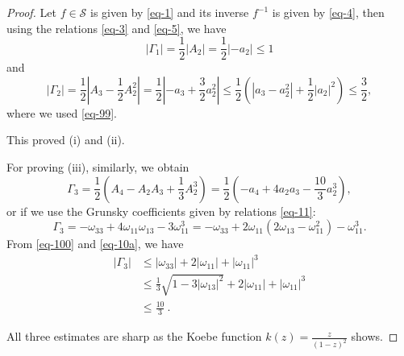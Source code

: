 \documentclass[10pt,a4paper]{amsart}
\begin{document}
\begin{proof}
Let $f\in\mathcal{S}$ is given by \eqref{eq-1} and its inverse $f^{-1}$ is given by \eqref{eq-4}, then using the relations \eqref{eq-3} and \eqref{eq-5}, we have
\[ |\Gamma_{1}|=\frac{1}{2}|A_{2}|=\frac{1}{2}|-a_{2}|\leq 1\]
and
\[|\Gamma_{2}|=\frac{1}{2}|A_{3}-\frac{1}{2}A_{2}^{2}|=\frac{1}{2}|-a_{3}+\frac{3}{2}a_{2}^{2}|
\leq \frac{1}{2}(|a_{3}-a_{2}^{2}|+\frac{1}{2}|a_{2}|^{2})\leq\frac{3}{2},\]
where we used \eqref{eq-99}.

\medskip

This proved (i) and (ii).

\medskip

For proving (iii), similarly, we obtain
\[
\Gamma_{3}=\frac{1}{2}\left( A_4-A_2A_3+\frac{1}{3}A_2^3\right)=\frac{1}{2}\left(-a_{4}+4a_{2}a_{3}-\frac{10}{3}a_{2}^{3}\right),
\]
or if we use the Grunsky coefficients given by relations \eqref{eq-11}:
\[\Gamma_{3} = -\omega_{33}+4\omega_{11}\omega_{13}-3\omega_{11}^{3} =-\omega_{33}+2\omega_{11}(2\omega_{13}-\omega_{11}^2)-\omega_{11}^{3}.\]
From \eqref{eq-100} and \eqref{eq-10a}, we have
\[
\begin{split}
|\Gamma_{3}| &\leq |\omega_{33}|+2|\omega_{11}|+|\omega_{11}|^{3} \\
&\leq \frac13\sqrt{1-3|\omega_{13}|^2}+2|\omega_{11}|+|\omega_{11}|^{3} \\
&\leq \frac{10}{3}\ .
\end{split}
\]

\medskip

All three estimates are sharp as the Koebe function $k(z)=\frac{z}{(1-z)^{2}}$ shows.
\end{proof}
\end{document}
